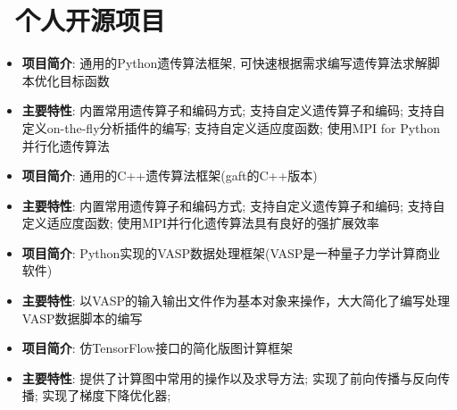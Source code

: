 \documentclass{resume}
\begin{document}
\section{\faUser\ 个人开源项目}

\begin{onehalfspacing}
\begin{itemize}
    \item \textbf{项目简介}: 通用的Python遗传算法框架, 可快速根据需求编写遗传算法求解脚本优化目标函数
    \item \textbf{主要特性}: 内置常用遗传算子和编码方式; 支持自定义遗传算子和编码; 支持自定义on-the-fly分析插件的编写; 支持自定义适应度函数; 使用MPI for Python并行化遗传算法
\end{itemize}
\end{onehalfspacing}

\begin{onehalfspacing}
\begin{itemize}
    \item \textbf{项目简介}: 通用的C++遗传算法框架(gaft的C++版本)
    \item \textbf{主要特性}: 内置常用遗传算子和编码方式; 支持自定义遗传算子和编码; 支持自定义适应度函数; 使用MPI并行化遗传算法具有良好的强扩展效率
\end{itemize}
\end{onehalfspacing}

\begin{onehalfspacing}
\begin{itemize}
    \item \textbf{项目简介}: Python实现的VASP数据处理框架(VASP是一种量子力学计算商业软件)
    \item \textbf{主要特性}: 以VASP的输入输出文件作为基本对象来操作，大大简化了编写处理VASP数据脚本的编写
\end{itemize}
\end{onehalfspacing}

\begin{onehalfspacing}
\begin{itemize}
    \item \textbf{项目简介}: 仿TensorFlow接口的简化版图计算框架
    \item \textbf{主要特性}: 提供了计算图中常用的操作以及求导方法; 实现了前向传播与反向传播; 实现了梯度下降优化器;
\end{itemize}
\end{onehalfspacing}
\end{document}
